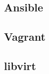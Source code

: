 \documentclass[../../deliverable-two.tex]{subfiles}
\begin{document}
\label{external-tools}

\subsection{Ansible}

\subsection{Vagrant}

\subsection{libvirt}
\end{document}
